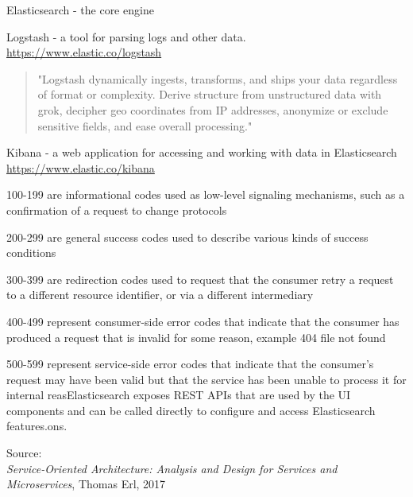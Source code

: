 \documentclass[Screen16to9,17pt]{foils}
\begin{document}
\begin{list2}
\item Elasticsearch - the core engine
\item Logstash - a tool for parsing logs and other data.\\
\url{https://www.elastic.co/logstash}
\begin{quote}
"Logstash dynamically ingests, transforms, and ships your data regardless of format or complexity. Derive structure from unstructured data with grok, decipher geo coordinates from IP addresses, anonymize or exclude sensitive fields, and ease overall processing."
\end{quote}
\item Kibana - a web application for accessing and working with data in Elasticsearch\\
\url{https://www.elastic.co/kibana}
\end{list2}


\begin{list2}
\item 100-199 are informational codes used as low-level signaling mechanisms, such as a confirmation of a request to change protocols
\item 200-299 are general success codes used to describe various kinds of success conditions
\item 300-399 are redirection codes used to request that the consumer retry a request to a different resource identifier, or via a different intermediary
\item 400-499 represent consumer-side error codes that indicate that the consumer has produced a request that is invalid for some reason, example 404 file not found
\item 500-599 represent service-side error codes that indicate that the consumer’s request may have been valid but that the service has been unable to process it for internal reasElasticsearch exposes REST APIs that are used by the UI components and can be called directly to configure and access Elasticsearch features.ons.
\end{list2}
Source: {\footnotesize\\
\emph{Service‑Oriented Architecture: Analysis and Design for Services and Microservices}, Thomas Erl, 2017}


\end{document}
